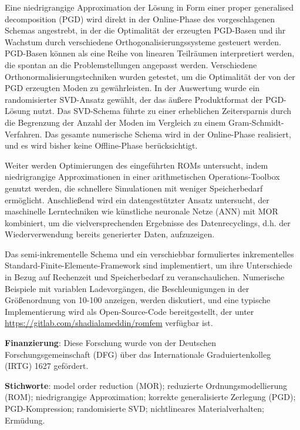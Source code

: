 Eine niedrigrangige Approximation der Lösung in Form einer proper generalised decomposition (PGD) wird direkt in der Online-Phase des vorgeschlagenen Schemas angestrebt, in der die Optimalität der erzeugten PGD-Basen und ihr Wachstum durch verschiedene Orthogonalisierungssysteme gesteuert werden. PGD-Basen können als eine Reihe von linearen Teilräumen interpretiert werden, die spontan an die Problemstellungen angepasst werden. Verschiedene Orthonormalisierungstechniken wurden getestet, um die Optimalität der von der PGD erzeugten Moden zu gewährleisten. In der Auswertung wurde ein randomisierter SVD-Ansatz gewählt, der das äußere Produktformat der PGD-Lösung nutzt. Das SVD-Schema führte zu einer erheblichen Zeitersparnis durch die Begrenzung der Anzahl der Moden im Vergleich zu einem Gram-Schmidt-Verfahren. Das gesamte numerische Schema wird in der Online-Phase realisiert, und es wird bisher keine Offline-Phase berücksichtigt.

Weiter werden Optimierungen des eingeführten ROMs untersucht, indem niedrigrangige Approximationen in einer arithmetischen Operations-Toolbox genutzt werden, die schnellere Simulationen mit weniger Speicherbedarf ermöglicht. Anschließend wird ein datengestützter Ansatz untersucht, der maschinelle Lerntechniken wie künstliche neuronale Netze (ANN) mit MOR kombiniert, um die vielversprechenden Ergebnisse des Datenrecyclings, d.h. der Wiederverwendung bereits generierter Daten, aufzuzeigen.

Das semi-inkrementelle Schema und ein verschiebbar formuliertes inkrementelles Standard-Finite-Elemente-Framework sind implementiert, um ihre Unterschiede in Bezug auf Rechenzeit und Speicherbedarf zu veranschaulichen. Numerische Beispiele mit variablen Ladevorgängen, die Beschleunigungen in der Größenordnung von 10-100 anzeigen, werden diskutiert, und eine typische Implementierung wird als Open-Source-Code bereitgestellt, der unter \url{https://gitlab.com/shadialameddin/romfem} verfügbar ist.

\textbf{Finanzierung}: Diese Forschung wurde von der Deutschen Forschungsgemeinschaft (DFG) über das Internationale Graduiertenkolleg (IRTG) 1627 gefördert.

\textbf{Stichworte}: model order reduction (MOR); reduzierte Ordnungsmodellierung (ROM); niedrigrangige Approximation; korrekte generalisierte Zerlegung (PGD); PGD-Kompression; randomisierte SVD; nichtlineares Materialverhalten; Ermüdung.



